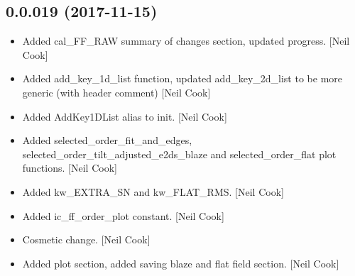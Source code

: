 \documentclass[a4paper,10pt,english]{report}
\begin{document}
\subsection{0.0.019 (2017-11-15)}
\label{\detokenize{misc/changelog:id530}}\begin{itemize}
\item {} 
Added cal\_FF\_RAW summary of changes section, updated progress. {[}Neil
Cook{]}

\item {} 
Added add\_key\_1d\_list function, updated add\_key\_2d\_list to be more
generic (with header comment) {[}Neil Cook{]}

\item {} 
Added AddKey1DList alias to init. {[}Neil Cook{]}

\item {} 
Added selected\_order\_fit\_and\_edges,
selected\_order\_tilt\_adjusted\_e2ds\_blaze and selected\_order\_flat plot
functions. {[}Neil Cook{]}

\item {} 
Added kw\_EXTRA\_SN and kw\_FLAT\_RMS. {[}Neil Cook{]}

\item {} 
Added ic\_ff\_order\_plot constant. {[}Neil Cook{]}

\item {} 
Cosmetic change. {[}Neil Cook{]}

\item {} 
Added plot section, added saving blaze and flat field section. {[}Neil
Cook{]}

\end{itemize}
\end{document}
